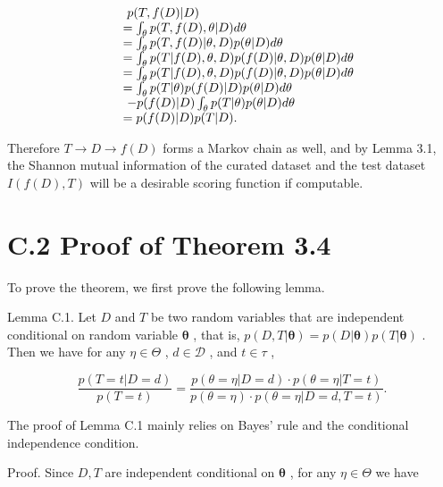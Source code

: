 \[
\begin{array} { r l } & { ~ p ( T , f ( D ) | D ) } \\ & { = \int _ { \theta } p ( T , f ( D ) , \theta | D ) d \theta } \\ & { = \int _ { \theta } p ( T , f ( D ) | \theta , D ) p ( \theta | D ) d \theta } \\ & { = \int _ { \theta } p ( T | f ( D ) , \theta , D ) p ( f ( D ) | \theta , D ) p ( \theta | D ) d \theta } \\ & { = \int _ { \theta } p ( T | f ( D ) , \theta , D ) p ( f ( D ) | \theta , D ) p ( \theta | D ) d \theta } \\ & { = \int _ { \theta } p ( T | \theta ) p ( f ( D ) | D ) p ( \theta | D ) d \theta } \\ & { ~ - p ( f ( D ) | D ) \int _ { \theta } p ( T | \theta ) p ( \theta | D ) d \theta } \\ & { = p ( f ( D ) | D ) p ( T | D ) . } \end{array}
\]

Therefore \(T \to D \to f ( D )\) forms a Markov chain as well, and by
Lemma 3.1, the Shannon mutual information of the curated dataset and the
test dataset \(I ( f ( D ) , T )\) will be a desirable scoring function
if computable.

\section{C.2 Proof of Theorem 3.4}\label{c.2-proof-of-theorem-3.4}

To prove the theorem, we first prove the following lemma.

Lemma C.1. Let \(D\) and \(T\) be two random variables that are
independent conditional on random variable \(\pmb \theta\) , that is,
\(p ( D , T | \pmb \theta ) = p ( D | \pmb \theta ) p ( T | \pmb \theta )\)
. Then we have for any \(\eta \in \Theta\) ,
\(d \in { \mathcal { D } }\) , and \(t \in \tau\) ,

\[
\frac { p ( T = t | D = d ) } { p ( T = t ) } = \frac { p ( \theta = \eta | D = d ) \cdot p ( \theta = \eta | T = t ) } { p ( \theta = \eta ) \cdot p ( \theta = \eta | D = d , T = t ) } .
\]

The proof of Lemma C.1 mainly relies on Bayes' rule and the conditional
independence condition.

Proof. Since \(D , T\) are independent conditional on \(\pmb \theta\) ,
for any \(\eta \in \Theta\) we have


